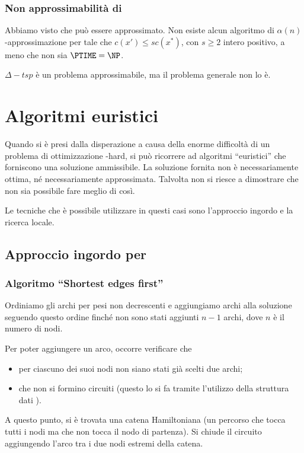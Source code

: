 \subsubsection{Non approssimabilità di {\tsp}}

Abbiamo visto che {\deltaTsp} può essere approssimato.
Non esiste alcun algoritmo di \(\alpha(n)\)-approssimazione per {\tsp} tale che \(c(x') \leqslant sc(x^*)\), con \(s \geqslant 2\) intero positivo, a meno che non sia \(\PTIME = \NP\).

\begin{note}
\(\Delta-tsp\) è un problema approssimabile, ma il problema generale non lo è.
\end{note}

\section{Algoritmi euristici}

Quando si è presi dalla disperazione a causa della enorme difficoltà di un problema di ottimizzazione {\NP}-hard, si può ricorrere ad algoritmi \enquote{euristici} che forniscono una soluzione ammissibile.
La soluzione fornita non è necessariamente ottima, né necessariamente approssimata.
Talvolta non si riesce a dimostrare che non sia possibile fare meglio di così.

Le tecniche che è possibile utilizzare in questi casi sono l'approccio ingordo e la ricerca locale.

\newpage
\subsection{Approccio ingordo per {\tsp}}

\subsubsection{Algoritmo \enquote{Shortest edges first}}

Ordiniamo gli archi per pesi non decrescenti e aggiungiamo archi alla soluzione seguendo questo ordine finché non sono stati aggiunti \(n-1\) archi, dove \(n\) è il numero di nodi.

Per poter aggiungere un arco, occorre verificare che
\begin{itemize}
	\item per ciascuno dei suoi nodi non siano stati già scelti due archi;
	\item che non si formino circuiti (questo lo si fa tramite l'utilizzo della struttura dati {\mfSet}).
\end{itemize}
A questo punto, si è trovata una catena Hamiltoniana (un percorso che tocca tutti i nodi ma che non tocca il nodo di partenza).
Si chiude il circuito aggiungendo l'arco tra i due nodi estremi della catena.

